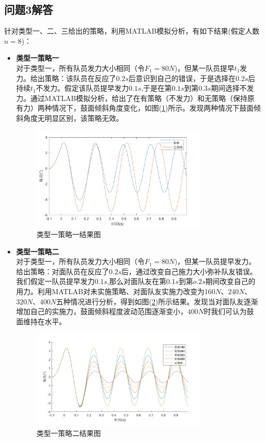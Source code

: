 \documentclass{cumcm}
\begin{document}
\subsection{问题3解答}
针对类型一、二、三给出的策略，利用MATLAB模拟分析，有如下结果(假定人数$n=8$)：
\begin{itemize}
\item \textbf{类型一策略一}\\
对于类型一，所有队员发力大小相同（令$F_1=80N$)，但某一队员提早$t_1$发力。给出策略：该队员在反应了$0.2s$后意识到自己的错误，于是选择在$0.2s$后持续$t_1$不发力。假定该队员提早发力$0.1s$,于是在第$0.1s$到第$0.3s$期间选择不发力。通过MATLAB模拟分析，给出了在有策略（不发力）和无策略（保持原有力）两种情况下，鼓面倾斜角度变化，如图(\ref{figtype1})所示。发现两种情况下鼓面倾斜角度无明显区别，该策略无效。
\begin{figure}[H]
\centering
\includegraphics[width=0.8\textwidth]{img/type1.pdf}
\caption{类型一策略一结果图}
\label{figtype1}
\end{figure}
\item \textbf{类型一策略二}\\
对于类型一，所有队员发力大小相同（令$F_1=80N$)，但某一队员提早发力。给出策略：对面队员在反应了$0.2s$后，通过改变自己施力大小弥补队友错误。我们假定一队员提早发力$0.1s$,那么对面队友在第$0.1s$到第$o.2s$期间改变自己的用力。利用MATLAB对未实施策略、对面队友实施力改变为$160N$、$240N$、$320N$、$400N$五种情况进行分析，得到如图(\ref{figtype2})所示结果。发现当对面队友逐渐增加自己的实施力，鼓面倾斜程度波动范围逐渐变小，$400N$时我们可认为鼓面维持在水平。
\begin{figure}[H]
\centering
\includegraphics[width=0.8\textwidth]{img/type2.pdf}
\caption{类型一策略二结果图}
\label{figtype2}
\end{figure}



\end{itemize}
\end{document}
